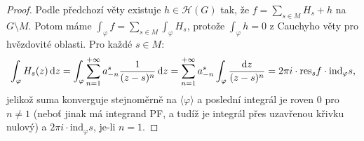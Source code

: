 \begin{proof}
Podle předchozí věty existuje $h \in \mathcal{H}(G)$ tak, že $f=\sum\limits_{s\in M}H_s+h$ na $G \setminus M$. Potom máme $\int_\varphi f=\sum\limits_{s\in M}\int_\varphi H_s$, protože $\int_\varphi h =0$ z Cauchyho věty pro hvězdovité oblasti. Pro každé $s \in M$:
$$
\int_\varphi H_s(z) \mathop{}\!\mathrm{d} z=\int_\varphi \sum\limits_{n=1}^{+\infty}a_{-n}^s\frac{1}{(z-s)^n} \mathop{}\!\mathrm{d} z = \sum\limits_{n=1}^{+\infty}a_{-n}^s \int_\varphi \frac{\mathop{}\!\mathrm{d} z}{(z-s)^n}=2\pi i \cdot \text{res}_sf\cdot \text{ind}_\varphi s\text{,}
$$
jelikož suma konverguje stejnoměrně na $\langle\varphi \rangle$ a poslední integrál je roven $0$ pro $n \neq 1$ (neboť jinak má integrand PF, a tudíž je integrál přes uzavřenou křivku nulový) a $2 \pi i \cdot \text{ind}_\varphi s$, je-li $n=1$.
\end{proof}
